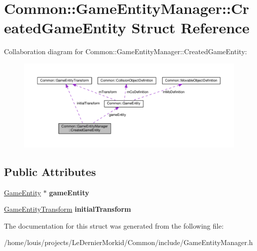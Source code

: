 \hypertarget{struct_common_1_1_game_entity_manager_1_1_created_game_entity}{}\section{Common\+:\+:Game\+Entity\+Manager\+:\+:Created\+Game\+Entity Struct Reference}
\label{struct_common_1_1_game_entity_manager_1_1_created_game_entity}


Collaboration diagram for Common\+:\+:Game\+Entity\+Manager\+:\+:Created\+Game\+Entity\+:\nopagebreak
\begin{figure}[H]
\begin{center}
\leavevmode
\includegraphics[width=350pt]{struct_common_1_1_game_entity_manager_1_1_created_game_entity__coll__graph}
\end{center}
\end{figure}
\subsection*{Public Attributes}
\begin{DoxyCompactItemize}
\item 
\mbox{\label{struct_common_1_1_game_entity_manager_1_1_created_game_entity_aaa44339ada4d32556d43ad60f1620647}} 
\hyperlink{struct_common_1_1_game_entity}{Game\+Entity} $\ast$ {\bfseries game\+Entity}
\item 
\mbox{\label{struct_common_1_1_game_entity_manager_1_1_created_game_entity_a66e0bb365ab3e2396628eb7cc7748eb8}} 
\hyperlink{struct_common_1_1_game_entity_transform}{Game\+Entity\+Transform} {\bfseries initial\+Transform}
\end{DoxyCompactItemize}


The documentation for this struct was generated from the following file\+:\begin{DoxyCompactItemize}
\item 
/home/louis/projects/\+Le\+Dernier\+Morkid/\+Common/include/Game\+Entity\+Manager.\+h\end{DoxyCompactItemize}
